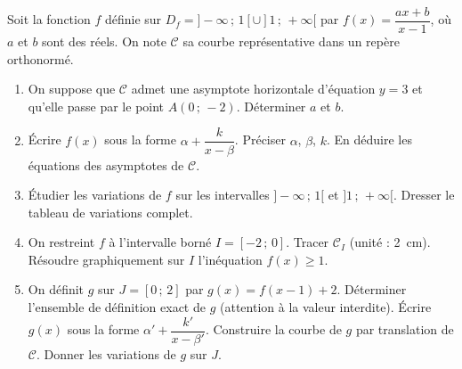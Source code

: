 \documentclass[11pt]{article}
\begin{document}
\begin{exercice}
Soit la fonction $f$ définie sur $D_f = ]-\infty\,;\, 1[ \cup ]1\,;\, +\infty[$ par $f(x) = \dfrac{ax + b}{x - 1}$, où $a$ et $b$ sont des réels. On note $\mathcal{C}$ sa courbe représentative dans un repère orthonormé.
\begin{enumerate}
    \item On suppose que $\mathcal{C}$ admet une asymptote horizontale d'équation $y = 3$ et qu'elle passe par le point $A(0\,;\, -2)$. Déterminer $a$ et $b$.
    \item Écrire $f(x)$ sous la forme $\alpha + \dfrac{k}{x - \beta}$. Préciser $\alpha$, $\beta$, $k$. En déduire les équations des asymptotes de $\mathcal{C}$.
    \item Étudier les variations de $f$ sur les intervalles $]-\infty\,;\, 1[$ et $]1\,;\, +\infty[$. Dresser le tableau de variations complet.
    \item On restreint $f$ à l'intervalle borné $I = [-2\,;\, 0]$. Tracer $\mathcal{C}_I$ (unité : \SI{2}{cm}). Résoudre graphiquement sur $I$ l'inéquation $f(x) \geqslant 1$.
    \item On définit $g$ sur $J = [0\,;\, 2]$ par $g(x) = f(x-1) + 2$. Déterminer l'ensemble de définition exact de $g$ (attention à la valeur interdite). Écrire $g(x)$ sous la forme $\alpha' + \dfrac{k'}{x - \beta'}$. Construire la courbe de $g$ par translation de $\mathcal{C}$. Donner les variations de $g$ sur $J$.
\end{enumerate}
\end{exercice}
\end{document}
